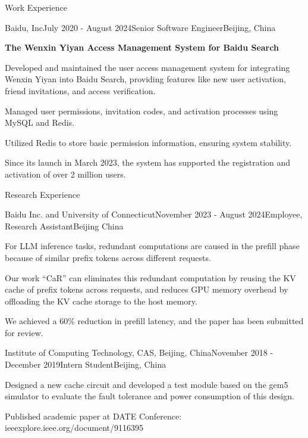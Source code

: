 \documentclass[
	11pt, %
]{resume} %
\begin{document}
\begin{rSection}{Work Experience}
\begin{rSubsection}{Baidu, Inc}{July 2020 - August 2024}{Senior Software Engineer}{Beijing, China}
    \vspace{1ex}
        
    \textbf{The Wenxin Yiyan Access Management System for Baidu Search}
	  \item Developed and maintained the user access management system for integrating Wenxin Yiyan into Baidu Search, providing features like new user activation, friend invitations, and access verification.
        \item Managed user permissions, invitation codes, and activation processes using MySQL and Redis.
        \item Utilized Redis to store basic permission information, ensuring system stability.
        \item Since its launch in March 2023, the system has supported the registration and activation of over 2 million users.
    \end{rSubsection}
\end{rSection}


\begin{rSection}{Research Experience}
    \begin{rSubsection}{Baidu Inc. and University of Connecticut}{November 2023 - August 2024}{Employee, Research Assistant}{Beijing China}
	\item For LLM inference tasks, redundant computations are caused in the prefill phase because of similar prefix tokens across different requests. 
    \item Our work “CaR” can eliminates this redundant computation by reusing the KV cache of prefix tokens across requests, and reduces GPU memory overhead by offloading the KV cache storage to the host memory. 
	\item We achieved a 60\% reduction in prefill latency, and the paper has been submitted for review. 
    \end{rSubsection}
    \begin{rSubsection}{Institute of Computing Technology, CAS, Beijing, China}{November 2018 - December 2019}{Intern Student}{Beijing, China}
		\item Designed a new cache circuit and developed a test module based on the gem5 simulator to evaluate the fault tolerance and power consumption of this design.
        \item Published academic paper at DATE Conference: ieeexplore.ieee.org/document/9116395
    \end{rSubsection}

\end{rSection}
\end{document}
